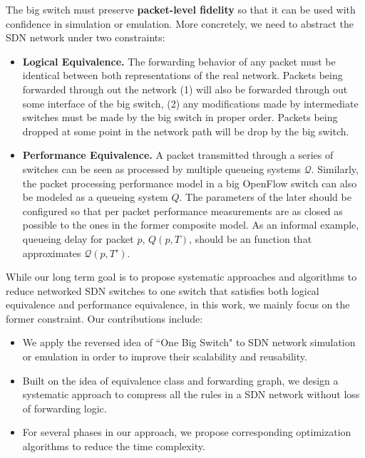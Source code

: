 The big switch must preserve \textbf{packet-level fidelity} so that
it can be used with confidence in simulation or emulation.
More concretely, we need to abstract the SDN network under two constraints:
\begin{itemize}
\item \textbf{Logical Equivalence.} The forwarding behavior of any packet must be identical
        between both representations of the real network. Packets being
        forwarded through out the network (1) will also be forwarded through out
        some interface of the big switch, (2) any modifications made by
        intermediate switches must be made by the big switch in proper order.
        Packets being dropped at some point in the network path will be drop by the
        big switch.
\item \textbf{Performance Equivalence.} A packet transmitted through a series of
        switches can be seen as processed by multiple queueing systems $\mathcal{Q}$.
        Similarly, the packet processing performance model in a big OpenFlow switch can
        also be modeled as a queueing system $Q$.
        The parameters of the later should be configured so that per packet performance
        measurements are as closed as possible to the ones in the former composite model.
        As an informal example, queueing delay for packet $p$, $Q(p, T)$, should be an
        function that approximates $\mathcal{Q}(p, T')$.
\end{itemize}

While our long term goal is to propose systematic approaches and algorithms to reduce
networked SDN switches to one switch that satisfies both logical equivalence and performance
equivalence, in this work, we mainly focus on the former constraint.
Our contributions include:
\begin{itemize}
\item We apply the reversed idea of ``One Big Switch"\cite{OneBigSwitchAbstraction}
        to SDN network simulation or emulation in order to
        improve their scalability and reusability.
\item Built on the idea of equivalence class and forwarding graph, we design
        a systematic approach to compress all the rules in a SDN network without
        loss of forwarding logic.
\item For several phases in our approach, we propose corresponding optimization
        algorithms to reduce the time complexity.
\end{itemize}


